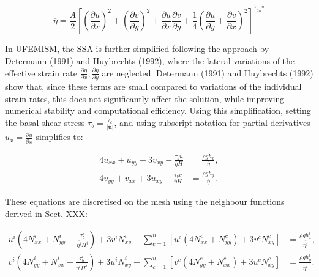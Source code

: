 \documentclass{article}
\begin{document}
\begin{equation} \label{eq:SSA_nu}
\overline{\eta} = \frac{A}{2} {\left[ 
{\left( \frac{\partial u}{\partial x} \right)}^2 + 
{\left( \frac{\partial v}{\partial y} \right)}^2 + 
\frac{\partial u}{\partial x} \frac{\partial v}{\partial y} + 
\frac14 {\left( \frac{\partial u}{\partial y} + \frac{\partial v}{\partial x} \right) }^2
\right]}^{\frac{1-n}{2n}}
\end{equation}

In UFEMISM, the SSA is further simplified following the approach by Determann (1991) and Huybrechts (1992), where the lateral variations of the effective strain rate $\frac{\partial \eta}{\partial x}, \frac{\partial \eta}{\partial y}$ are neglected. Determann (1991) and Huybrechts (1992) show that, since these terms are small compared to variations of the individual strain rates, this does not significantly affect the solution, while improving numerical stability and computational efficiency. Using this simplification, setting the basal shear stress $\tau_b = \frac{\tau_c}{|\textbf{u}|}$, and using subscript notation for partial derivatives $u_x = \frac{\partial u}{\partial x}$ simplifies to:

\begin{align} \label{eq:SSA_simple}
4 u_{xx} + u_{yy} + 3 v_{xy} - \frac{\tau_b u}{\overline{\eta}H} &= \frac{\rho g h_x}{\overline{\eta}}, \\
4 v_{yy} + v_{xx} + 3 u_{xy} - \frac{\tau_b v}{\overline{\eta}H} &= \frac{\rho g h_y}{\overline{\eta}}.
\end{align}

These equations are discretised on the mesh using the neighbour functions derived in Sect. XXX:

\begin{align} \label{eq:SSA_disc}
u^i \left( 4 N_{xx}^i + N_{yy}^i - \frac{\tau_b^i}{\overline{\eta^i} H^i} \right) + 3 v^i N_{xy}^i + 
\sum_{c=1}^n \left[ u^c \left( 4 N_{xx}^c + N_{yy}^c \right) + 3 v^c N_{xy}^c \right] &= \frac{\rho g h_x^i}{\overline{\eta^i}}, \\
v^i \left( 4 N_{yy}^i + N_{xx}^i - \frac{\tau_b^i}{\overline{\eta^i} H^i} \right) + 3 u^i N_{xy}^i + 
\sum_{c=1}^n \left[ v^c \left( 4 N_{yy}^c + N_{xx}^c \right) + 3 u^c N_{xy}^c \right] &= \frac{\rho g h_y^i}{\overline{\eta^i}}.
\end{align}
\end{document}
